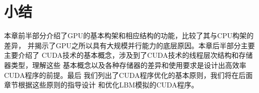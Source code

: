 \section{小结}
本章前半部分介绍了GPU的基本构架和相应结构的功能，比较了其与CPU构架的差异，
并揭示了GPU之所以具有大规模并行能力的底层原因。本章后半部分主要主要介绍了
CUDA技术的基本概念，涉及到了CUDA技术的线程层次结构和存储器类型，理解这些
基本概念以及各种存储器的差异和使用要求是设计出高效率CUDA程序的前提。最后
我们列出了CUDA程序优化的基本原则，我们将在后面章节根据这些原则的指导设计
和优化LBM模拟的CUDA程序。

